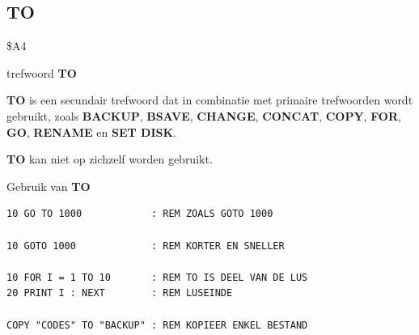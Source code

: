 
\newpage
\subsection{TO}
\begin{description}[leftmargin=2cm,style=nextline]
\item [Token:]    \$A4

\item [Formaat:]   trefwoord {\bf TO}

\item [Gebruik:]    {\bf TO} is een secundair trefwoord dat in combinatie met primaire tref\-woorden wordt gebruikt, zoals {\bf BACKUP}, {\bf BSAVE}, {\bf CHANGE}, {\bf CONCAT}, {\bf COPY}, {\bf FOR}, {\bf GO}, {\bf RENAME} en {\bf SET DISK}.

\item [Opmerkingen:]  {\bf TO} kan niet op zichzelf worden gebruikt.

\item [Voorbeeld:]  Gebruik van {\bf TO}

\begin{tcolorbox}[colback=black,coltext=white]
\verbatimfont{\codefont}
\begin{verbatim}
10 GO TO 1000            : REM ZOALS GOTO 1000

10 GOTO 1000             : REM KORTER EN SNELLER

10 FOR I = 1 TO 10       : REM TO IS DEEL VAN DE LUS
20 PRINT I : NEXT        : REM LUSEINDE

COPY "CODES" TO "BACKUP" : REM KOPIEER ENKEL BESTAND
\end{verbatim}
\end{tcolorbox}
\end{description}


\newpage
